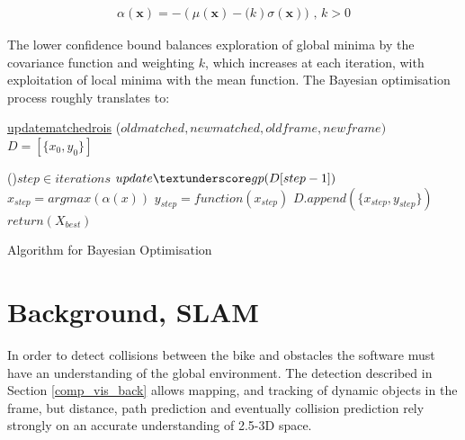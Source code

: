 \documentclass[11pt,twoside]{report}
\begin{document}
\begin{equation}
\begin{aligned}
\alpha(\mathbf{x}) = -(\mu(\mathbf{x}) - \mathit(k) \sigma (\mathbf{x})) \text{ , } k>0
\end{aligned}
\label{gp_lower_confidence}
\end{equation}


The lower confidence bound balances exploration of global minima by the covariance function and weighting $k$, which increases at each iteration, with exploitation of local minima with the mean function. The Bayesian optimisation process roughly translates to:

\begin{algorithm}
	\DontPrintSemicolon
	\SetAlgoLined
	\underline{update\textunderscore matched\textunderscore rois} ($old$\textunderscore$matched,new$\textunderscore$matched,old$\textunderscore$frame,new$\textunderscore$frame)$\;
	\texttt{\\}
	$D = [\{ x_{0},y_{0} \}]$ 
	
	\ForEach(){$step \in iterations$}{
		$update \textunderscore gp(D[step-1])$ 
		$x_{step} = argmax(\alpha(x))$ 
		$y_{step} = function(x_{step})$ 
		$D.append( \{ x_{step},y_{step} \} )$ 
	}
	$return (X_{best})$ 
	\texttt{\\}
	\caption{Algorithm for Bayesian Optimisation}
	\label{alg:weights}
\end{algorithm}



\section{Background, SLAM} \label{back_slam}
In order to detect collisions between the bike and obstacles the software must have an understanding of the global environment. The detection described in Section \ref{comp_vis_back} allows mapping, and tracking of dynamic objects in the frame, but distance, path prediction and eventually collision prediction rely strongly on an accurate understanding of 2.5-3D space.
\end{document}
